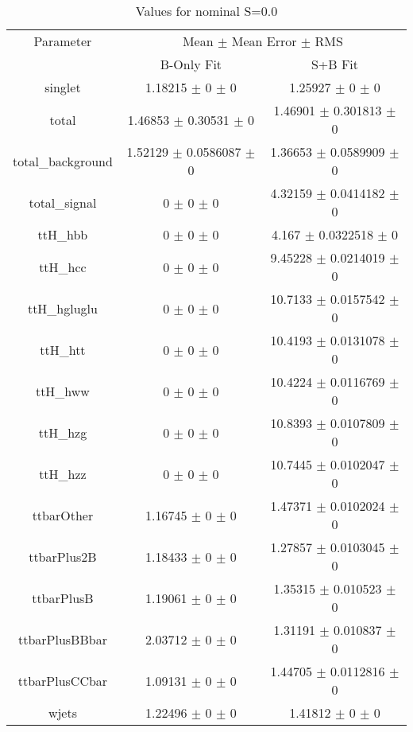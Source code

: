 \begin{table}
\centering
\caption{Values for nominal S=0.0}
\begin{tabular}{ccc}
\toprule
Parameter & \multicolumn{2}{c}{Mean $\pm$ Mean Error $\pm$ RMS}\\
 & B-Only Fit & S+B Fit\\
\midrule
singlet & \num{1.18215} $\pm$ \num{0} $\pm$ \num{0} & \num{1.25927} $\pm$ \num{0} $\pm$ \num{0}\\
total & \num{1.46853} $\pm$ \num{0.30531} $\pm$ \num{0} & \num{1.46901} $\pm$ \num{0.301813} $\pm$ \num{0}\\
total\_background & \num{1.52129} $\pm$ \num{0.0586087} $\pm$ \num{0} & \num{1.36653} $\pm$ \num{0.0589909} $\pm$ \num{0}\\
total\_signal & \num{0} $\pm$ \num{0} $\pm$ \num{0} & \num{4.32159} $\pm$ \num{0.0414182} $\pm$ \num{0}\\
ttH\_hbb & \num{0} $\pm$ \num{0} $\pm$ \num{0} & \num{4.167} $\pm$ \num{0.0322518} $\pm$ \num{0}\\
ttH\_hcc & \num{0} $\pm$ \num{0} $\pm$ \num{0} & \num{9.45228} $\pm$ \num{0.0214019} $\pm$ \num{0}\\
ttH\_hgluglu & \num{0} $\pm$ \num{0} $\pm$ \num{0} & \num{10.7133} $\pm$ \num{0.0157542} $\pm$ \num{0}\\
ttH\_htt & \num{0} $\pm$ \num{0} $\pm$ \num{0} & \num{10.4193} $\pm$ \num{0.0131078} $\pm$ \num{0}\\
ttH\_hww & \num{0} $\pm$ \num{0} $\pm$ \num{0} & \num{10.4224} $\pm$ \num{0.0116769} $\pm$ \num{0}\\
ttH\_hzg & \num{0} $\pm$ \num{0} $\pm$ \num{0} & \num{10.8393} $\pm$ \num{0.0107809} $\pm$ \num{0}\\
ttH\_hzz & \num{0} $\pm$ \num{0} $\pm$ \num{0} & \num{10.7445} $\pm$ \num{0.0102047} $\pm$ \num{0}\\
ttbarOther & \num{1.16745} $\pm$ \num{0} $\pm$ \num{0} & \num{1.47371} $\pm$ \num{0.0102024} $\pm$ \num{0}\\
ttbarPlus2B & \num{1.18433} $\pm$ \num{0} $\pm$ \num{0} & \num{1.27857} $\pm$ \num{0.0103045} $\pm$ \num{0}\\
ttbarPlusB & \num{1.19061} $\pm$ \num{0} $\pm$ \num{0} & \num{1.35315} $\pm$ \num{0.010523} $\pm$ \num{0}\\
ttbarPlusBBbar & \num{2.03712} $\pm$ \num{0} $\pm$ \num{0} & \num{1.31191} $\pm$ \num{0.010837} $\pm$ \num{0}\\
ttbarPlusCCbar & \num{1.09131} $\pm$ \num{0} $\pm$ \num{0} & \num{1.44705} $\pm$ \num{0.0112816} $\pm$ \num{0}\\
wjets & \num{1.22496} $\pm$ \num{0} $\pm$ \num{0} & \num{1.41812} $\pm$ \num{0} $\pm$ \num{0}\\
\bottomrule
\end{tabular}
\end{table}